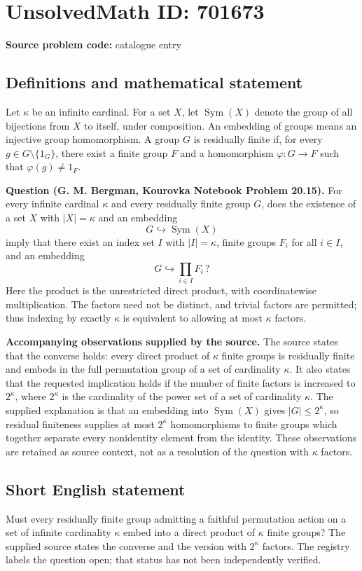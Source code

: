 \documentclass[11pt]{article}
\begin{document}
\section*{UnsolvedMath ID: 701673}
\textbf{Source problem code:} catalogue entry
\subsection{Definitions and mathematical statement}
Let \(\kappa\) be an infinite cardinal. For a set \(X\), let \(\operatorname{Sym}(X)\) denote the group of all bijections from \(X\) to itself, under composition. An embedding of groups means an injective group homomorphism. A group \(G\) is residually finite if, for every \(g\in G\setminus\{1_G\}\), there exist a finite group \(F\) and a homomorphism \(\varphi:G\to F\) such that \(\varphi(g)\ne 1_F\).

\textbf{Question (G. M. Bergman, Kourovka Notebook Problem 20.15).} For every infinite cardinal \(\kappa\) and every residually finite group \(G\), does the existence of a set \(X\) with \(|X|=\kappa\) and an embedding
\[
G\hookrightarrow\operatorname{Sym}(X)
\]
imply that there exist an index set \(I\) with \(|I|=\kappa\), finite groups \(F_i\) for all \(i\in I\), and an embedding
\[
G\hookrightarrow\prod_{i\in I}F_i\,?
\]
Here the product is the unrestricted direct product, with coordinatewise multiplication. The factors need not be distinct, and trivial factors are permitted; thus indexing by exactly \(\kappa\) is equivalent to allowing at most \(\kappa\) factors.

\textbf{Accompanying observations supplied by the source.} The source states that the converse holds: every direct product of \(\kappa\) finite groups is residually finite and embeds in the full permutation group of a set of cardinality \(\kappa\). It also states that the requested implication holds if the number of finite factors is increased to \(2^\kappa\), where \(2^\kappa\) is the cardinality of the power set of a set of cardinality \(\kappa\). The supplied explanation is that an embedding into \(\operatorname{Sym}(X)\) gives \(|G|\leq 2^\kappa\), so residual finiteness supplies at most \(2^\kappa\) homomorphisms to finite groups which together separate every nonidentity element from the identity. These observations are retained as source context, not as a resolution of the question with \(\kappa\) factors.
\subsection{Short English statement}
Must every residually finite group admitting a faithful permutation action on a set of infinite cardinality \(\kappa\) embed into a direct product of \(\kappa\) finite groups? The supplied source states the converse and the version with \(2^\kappa\) factors. The registry labels the question open; that status has not been independently verified.
\end{document}
